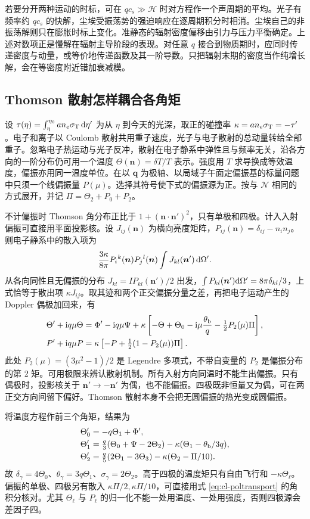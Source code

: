 若要分开两种运动的时标，可在 $q c_s\gg\mathcal H$ 时对方程作一个声周期的平均。光子有频率约 $q c_s$ 的快解，尘埃受振荡势的强迫响应在逐周期积分时相消。尘埃自己的非振荡解则只在膨胀时标上变化。准静态的辐射密度偏移由引力与压力平衡确定。上述对数项正是慢解在辐射主导阶段的表现。对任意 $q$ 接合到物质期时，应同时传递密度与动量，或等价地传递函数及其一阶导数。只把辐射末期的密度当作纯增长解，会在等密度附近错加衰减模。

\subsection{Thomson 散射怎样耦合各角矩}

设 $\tau(\eta)=\int_\eta^{\eta_0}a n_e\sigma_{\rm T}\,\dd\eta'$ 为从 $\eta$ 到今天的光深，取正的碰撞率 $\kappa=a n_e\sigma_{\rm T}=-\tau'$。电子和离子以 Coulomb 散射共用重子速度，光子与电子散射的总动量转给全部重子。忽略电子热运动与光子反冲，散射在电子静系中弹性且与频率无关，沿各方向的一阶分布仍可用一个温度 $\Theta(\bm n)=\delta T/T$ 表示。强度用 $T$ 求导换成等效温度，偏振亦用同一温度单位。在以 $\bm q$ 为极轴、以局域子午面定偏振基的标量问题中只须一个线偏振量 $P(\mu)$。选择其符号使下式的偏振源为正。按与 $\mathcal N$ 相同的方式展开，并记 $\Pi=\Theta_2+P_0+P_2$。

不计偏振时 Thomson 角分布正比于 $1+(\bm n\cdot\bm n')^2$，只有单极和四极。计入入射偏振可直接用平面投影核。设 $J_{ij}(\bm n)$ 为横向亮度矩阵，$P_{ij}(\bm n)=\delta_{ij}-n_i n_j$。则电子静系中的散入项为
\[
 \frac{3\kappa}{8\pi}P_i{}^k(\bm n)P_j{}^l(\bm n)
           \int J_{kl}(\bm n')\,\dd\Omega' .
\]
从各向同性且无偏振的分布 $J_{kl}=I P_{kl}(\bm n')/2$ 出发，$\int P_{kl}(\bm n')\dd\Omega'=8\pi\delta_{kl}/3$，上式恰等于散出项 $\kappa J_{ij}$。取其迹和两个正交偏振分量之差，再把电子运动产生的 Doppler 偶极加回来，有
\begin{align}
 \Theta'+\mathrm{i} q\mu\Theta&=\Phi'-\mathrm{i} q\mu\Psi
 +\kappa\left[-\Theta+\Theta_0-\mathrm{i}\mu\frac{\theta_{\rm b}}q
                         -\tfrac12 P_2(\mu)\Pi\right],\label{eq:cl-thomson}\\
 P'+\mathrm{i} q\mu P&=\kappa\left[-P+\tfrac12(1-P_2(\mu))\Pi\right].
 \label{eq:cl-poltransport}
\end{align}
此处 $P_2(\mu)=(3\mu^2-1)/2$ 是 Legendre 多项式，不带自变量的 $P_2$ 是偏振分布的第 2 矩。可用极限来辨认散射机制。所有入射方向同温时不能生出偏振。只有偶极时，投影核关于 $\bm n'\to-\bm n'$ 为偶，也不能偏振。四极既非恒量又为偶，可在两正交方向间留下偏好。Thomson 散射本身不会把无圆偏振的热光变成圆偏振。

将温度方程作前三个角矩，结果为
\begin{align*}
 \Theta_0'&=-q\Theta_1+\Phi',\\
 \Theta_1'&=\tfrac q3(\Theta_0+\Psi-2\Theta_2)
                      -\kappa(\Theta_1-\theta_{\rm b}/3q),\\
 \Theta_2'&=\tfrac q5(2\Theta_1-3\Theta_3)
                      -\kappa(\Theta_2-\Pi/10).
\end{align*}
故 $\delta_\gamma=4\Theta_0$、$\theta_\gamma=3q\Theta_1$、$\sigma_\gamma=2\Theta_2$。高于四极的温度矩只有自由飞行和 $-\kappa\Theta_\ell$。偏振的单极、四极另有散入 $\kappa\Pi/2,\kappa\Pi/10$，可直接用式 \eqref{eq:cl-poltransport} 的角积分核对。尤其 $\Theta_\ell$ 与 $P_\ell$ 的归一化不能一处用温度、一处用强度，否则四极源会差因子四。

